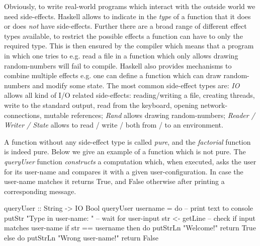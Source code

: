 Obviously, to write real-world programs which interact with the outside world we need side-effects. Haskell allows to indicate in the \textit{type} of a function that it does or does \textit{not} have side-effects. Further there are a broad range of different effect types available, to restrict the possible effects a function can have to only the required type. This is then ensured by the compiler which means that a program in which one tries to e.g. read a file in a function which only allows drawing random-numbers will fail to compile. Haskell also provides mechanisms to combine multiple effects e.g. one can define a function which can draw random-numbers and modify some state. The most common side-effect types are: \textit{IO} allows all kind of I/O related side-effects: reading/writing a file, creating threads, write to the standard output, read from the keyboard, opening network-connections, mutable references; \textit{Rand}  allows drawing random-numbers; \textit{Reader / Writer / State} allows to read / write / both from / to an environment.

A function without any side-effect type is called \textit{pure}, and the \textit{factorial} function is indeed pure. Below we give an example of a function which is not pure. The \textit{queryUser} function \textit{constructs} a computation which, when executed, asks the user for its user-name and compares it with a given user-configuration. In case the user-name matches it returns True, and False otherwise after printing a corresponding message. 

\begin{HaskellCode}
queryUser :: String -> IO Bool
queryUser username = do
  -- print text to console
  putStr "Type in user-name: "
  -- wait for user-input
  str <- getLine
  -- check if input matches user-name
  if str == username
    then do
      putStrLn "Welcome!"			
      return True
    else do
      putStrLn "Wrong user-name!"
      return False
\end{HaskellCode}


